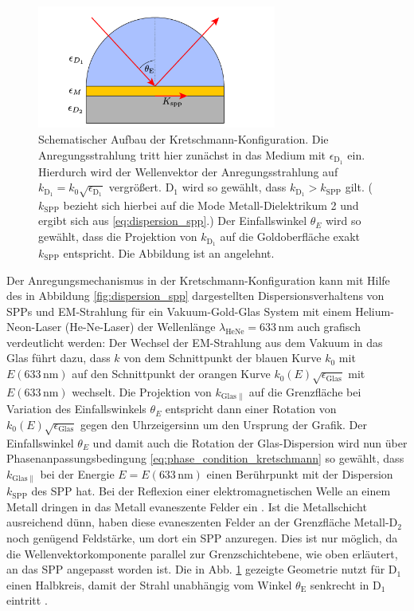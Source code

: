 \documentclass[a4paper, titlepage,  ngerman]{book}
\begin{document}
	\begin{figure} 
		\centering
		\includegraphics[width=0.7\textwidth]{figures/Kretschmann.pdf}
		\caption[Kretschmann-Konfiguration]{Schematischer Aufbau der Kretschmann-Konfiguration. Die Anregungsstrahlung tritt hier zunächst in das Medium mit $\epsilon_{\mathrm{D}_1}$ ein. Hierdurch wird der Wellenvektor der Anregungsstrahlung auf $k_{\mathrm{D}_1}=k_0\sqrt{\epsilon_{\mathrm{D}_1}}$ vergrößert. $\mathrm{D}_1$ wird so gewählt, dass $k_{\mathrm{D}_1}> k_{\mathrm{SPP}}$ gilt. ($k_{\mathrm{SPP}}$ bezieht sich hierbei auf die Mode Metall-Dielektrikum 2 und ergibt sich aus \eqref{eq:dispersion_spp}.) Der Einfallswinkel $\theta_E$ wird so gewählt, dass die Projektion von $k_{\mathrm{D}_1}$ auf die Goldoberfläche exakt $k_{\mathrm{SPP}}$ entspricht. Die Abbildung ist an \cite{Jaruschewski.2020} angelehnt.}
		\label{fig:kretschman}
	\end{figure}Der Anregungsmechanismus in der Kretschmann-Konfiguration kann mit Hilfe des in Abbildung \ref{fig:dispersion_spp} dargestellten Dispersionsverhaltens von SPPs und EM-Strahlung für ein Vakuum-Gold-Glas System mit einem Helium-Neon-Laser (He-Ne-Laser) der Wellenlänge $\lambda_{\mathrm{HeNe}}=633\,\mathrm{nm}$ auch grafisch verdeutlicht werden: Der Wechsel der EM-Strahlung aus dem Vakuum in das Glas führt dazu, dass $k$ von dem Schnittpunkt der blauen Kurve $k_0$ mit $E(633 \, \mathrm{nm})$ auf den Schnittpunkt der orangen Kurve $k_0(E)\sqrt{\epsilon_\mathrm{Glas}}$ mit $E(633 \, \mathrm{nm})$ wechselt. Die Projektion von $k_{\mathrm{Glas}\parallel}$ auf die Grenzfläche bei Variation des Einfallswinkels $\theta_E$ entspricht dann einer Rotation von $k_0(E)\sqrt{\epsilon_\mathrm{Glas}}$ gegen den Uhrzeigersinn um den Ursprung der Grafik. Der Einfallswinkel  $\theta_E$ und damit auch die Rotation der Glas-Dispersion wird nun über Phasenanpassungsbedingung \eqref{eq:phase_condition_kretschmann} so gewählt, dass $k_{\mathrm{Glas}\parallel}$ bei der Energie $E=E(633\,\mathrm{nm})$ einen Berührpunkt mit der Dispersion $k_\mathrm{SPP}$ des SPP hat.
	Bei der Reflexion einer elektromagnetischen Welle an einem Metall dringen in das Metall evaneszente Felder ein \cite{Novotny.2012b}. Ist die Metallschicht ausreichend dünn, haben diese evaneszenten Felder an der Grenzfläche Metall-$\mathrm{D}_2$ noch genügend Feldstärke, um dort ein SPP anzuregen. Dies ist nur möglich, da die Wellenvektorkomponente parallel zur Grenzschichtebene, wie oben erläutert, an das SPP angepasst worden ist. Die in Abb. \ref{fig:kretschman} gezeigte Geometrie nutzt für $\mathrm{D}_1$ einen Halbkreis, damit der Strahl unabhängig vom Winkel $\theta_\mathrm{E}$ senkrecht in $\mathrm{D}_1$ eintritt \cite{Kretschmann.1971}.
\end{document}
